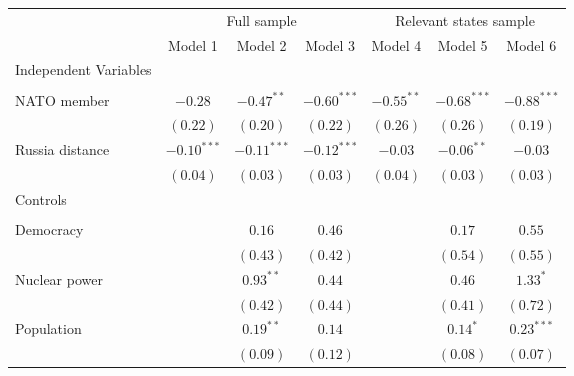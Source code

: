 
\begin{table}[h]
\begin{center}
\begin{tabular}{l c c c c c c}
\hline
 & \multicolumn{3}{c}{Full sample} & \multicolumn{3}{c}{Relevant states sample} \\
\cline{2-4} \cline{5-7}
 & Model 1 & Model 2 & Model 3 & Model 4 & Model 5 & Model 6 \\
\hline
Independent Variables &               &               &               &              &               &               \\
                      &               &               &               &              &               &               \\
\quad NATO member     & $-0.28$       & $-0.47^{**}$  & $-0.60^{***}$ & $-0.55^{**}$ & $-0.68^{***}$ & $-0.88^{***}$ \\
                      & $(0.22)$      & $(0.20)$      & $(0.22)$      & $(0.26)$     & $(0.26)$      & $(0.19)$      \\
\quad Russia distance & $-0.10^{***}$ & $-0.11^{***}$ & $-0.12^{***}$ & $-0.03$      & $-0.06^{**}$  & $-0.03$       \\
                      & $(0.04)$      & $(0.03)$      & $(0.03)$      & $(0.04)$     & $(0.03)$      & $(0.03)$      \\
Controls              &               &               &               &              &               &               \\
                      &               &               &               &              &               &               \\
\quad Democracy       &               & $0.16$        & $0.46$        &              & $0.17$        & $0.55$        \\
                      &               & $(0.43)$      & $(0.42)$      &              & $(0.54)$      & $(0.55)$      \\
\quad Nuclear power   &               & $0.93^{**}$   & $0.44$        &              & $0.46$        & $1.33^{*}$    \\
                      &               & $(0.42)$      & $(0.44)$      &              & $(0.41)$      & $(0.72)$      \\
\quad Population      &               & $0.19^{**}$   & $0.14$        &              & $0.14^{*}$    & $0.23^{***}$  \\
                      &               & $(0.09)$      & $(0.12)$      &              & $(0.08)$      & $(0.07)$      \\

\end{tabular}
\end{center}
\end{table}
